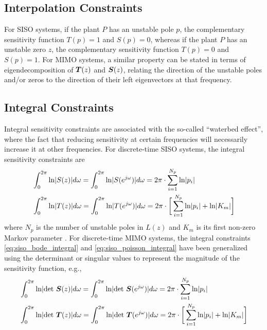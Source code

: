 \subsection{Interpolation Constraints}
For SISO systems, if the plant $P$ has an unstable pole $p$, the complementary sensitivity function $T(p) = 1$ and $S(p) = 0$, whereas if the plant $P$ has an unstable zero $z$, the complementary sensitivity function $T(p) = 0$ and $S(p) = 1$.  For MIMO systems, a similar property can be stated in terms of eigendecomposition of $\vb*{T}(z)$ and $\vb*{S}(z)$, relating the direction of the unstable poles and/or zeros to the direction of their left eigenvectors at that frequency.

\subsection{Integral Constraints}
Integral sensitivity constraints are associated with the so-called ``waterbed effect'', where the fact that reducing sensitivity at certain frequencies will necessarily increase it at other frequencies.  For discrete-time SISO systems, the integral sensitivity constraints are
\begin{subequations}
\label{eq:bode_integral_equations_siso}
\begin{align}
	&\int_{0}^{2\pi} \text{ln} |S(z)| d\omega = \int_{0}^{2\pi} \text{ln} |S(e^{j\omega})| d\omega
		= 2\pi \cdot \sum_{i=1}^{N_{p}} \text{ln}|p_{i}| \label{eq:siso_bode_integral}\\
	&\int_{0}^{2\pi} \text{ln} |T(z)| d\omega = \int_{0}^{2\pi} \text{ln} |T(e^{j\omega})| d\omega
		= 2\pi \cdot \bigg{[} \sum_{i=1}^{N_{p}} \text{ln}|p_{i}| + \text{ln}|K_{m}| \bigg{]} \label{eq:siso_poisson_integral}
\end{align}
\end{subequations}
where $N_{p}$ is the number of unstable poles in $L(z)$ and $K_{m}$ is its first non-zero Markov parameter \cite{sung1988properties, sung1989properties, emami2019bode}.  For discrete-time MIMO systems, the integral constraints \eqref{eq:siso_bode_integral} and \eqref{eq:siso_poisson_integral} have been generalized using the determinant \cite{emami2019bode} or singular values \cite{freudenberg1988frequency, hara1989constraints, mohtadi1990bode} to represent the magnitude of the sensitivity function, e.g.,
\begin{subequations}
\label{eq:bode_integral_equations_siso}
\begin{align}
	&\int_{0}^{2\pi} \text{ln} |\text{det } \vb*{S}(z)| d\omega = \int_{0}^{2\pi} \text{ln} |\text{det } \vb*{S}(e^{j\omega})| d\omega
		= 2\pi \cdot \sum_{i=1}^{N_{p}} \text{ln}|p_{i}| \label{eq:siso_bode_integral}\\
	&\int_{0}^{2\pi} \text{ln} |\text{det } \vb*{T}(z)| d\omega = \int_{0}^{2\pi} \text{ln} |\text{det } \vb*{T}(e^{j\omega})| d\omega
		= 2\pi \cdot \bigg{[} \sum_{i=1}^{N_{p}} \text{ln}|p_{i}| + \text{ln}|K_{m}| \bigg{]} \label{eq:siso_poisson_integral}
\end{align}
\end{subequations}

